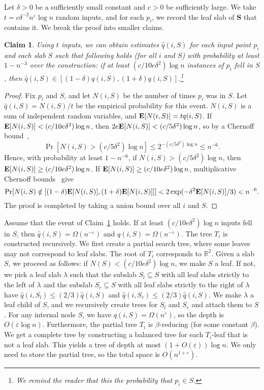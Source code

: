 \documentclass[letterpaper,11pt]{article}
\newtheorem{claim}[theorem]{Claim}
\newcommand{\eps}{\varepsilon}
\newcommand{\EX}{\hbox{\bf E}}
\newcommand{\R}{\mathbb{R}}
\newcommand{\bS}{\textbf{S}}
\begin{document}
Let $\delta > 0$ be a sufficiently 
small constant and $c > 0$
be sufficiently large. 
We take $t = c\delta^{-2}n^{\eps}\log n$ 
random inputs, and  for each $p_i$, we 
record the leaf slab of $\bS$ that 
contains it. We break the
proof into smaller claims.

\begin{claim} \label{clm:prob} 
  Using $t$ inputs, we can
  obtain estimates 
  $\hat{q}(i,S)$ for each input point $p_i$ 
  and each slab $S$ such that following 
  holds (for all $i$ and $S$)
  with probability at least $1 - n^{-3}$ over 
  the construction: 
  if at least $(c/10e\delta^{2})\log n$ 
  instances of $p_i$ fell in $S$,
  then $\hat{q}(i,S) \in  
  [(1-\delta)q(i,S),(1+\delta)q(i,S)]$.\footnote{We 
  remind the reader that this the
  probability that $p_i \in S$.}
\end{claim}

\begin{proof}
Fix $p_i$ and $S$, and
let $N(i,S)$ be the 
number of times $p_i$
was in $S$. 
Let $\hat{q}(i,S) = N(i,S)/t$ 
be the empirical 
probability for this event.
$N(i,S)$ is a sum of independent
random variables, and
$\EX[N(i,S)] = tq(i,S)$.
If $\EX[N(i,S)] < (c/10e\delta^{2})\log n$, 
then 
$2e\EX[N(i,S)] < (c/5\delta^2)\log n $, so
by a Chernoff 
bound~\cite[Theorem~1.1, Eq. (1.8)]{DubhashiPa09}, 
\[
  \Pr[N(i,S) > (c/5\delta^2)\log n] \leq 2^{-(c/5\delta^2)\log n} \leq n^{-6}.
\]
Hence, with probability at 
least $1-n^{-6}$, if 
$N(i,S) > (c/5\delta^2)\log n$, 
then $\EX[N(i,S)] \geq (c/10e\delta^{2})\log n$.
If $\EX[N(i,S)] \geq (c/10e\delta^{2})\log n$,  
multiplicative Chernoff 
bounds~\cite[Theorem 1.1, Eq. (1.7)]{DubhashiPa09}
give
\[
  \Pr[N(i,S) \notin [(1-\delta)\EX[N(i,S)], (1+\delta)\EX[N(i,S)]]] < 
    2\exp(-\delta^2\EX[N(i,S)]/3) < n^{-6}.
\]
The proof is completed by taking a union bound over all $i$ and $S$.
\end{proof}

Assume that the event
of Claim~\ref{clm:prob} holds.
If at least $(c/10e\delta^{2})\log n$ 
inputs fell in $S$, then 
$\hat{q}(i,S) = \Omega(n^{-\eps})$
and $q(i,S) = \Omega(n^{-\eps})$.
The tree $T_i$ is constructed recursively.
We first create a partial search tree, where
some leaves may not correspond to leaf slabs.
The root of $T_i$ corresponds to 
$\R^2$. Given a slab
$S$, we proceed as follows:
if $N(S) < (c/10e\delta^{2})\log n$, we make
$S$ a leaf. If not, we pick a leaf slab 
$\lambda$ such that the subslab 
$S_l \subseteq S$ with all leaf slabs 
strictly to the left of $\lambda$ and
the subslab $S_r \subseteq S$ with all 
leaf slabs strictly 
to the right of $\lambda$ have 
$\hat{q}(i,S_l) \leq (2/3)\hat{q}(i,S)$ and
$\hat{q}(i,S_r) \leq (2/3)\hat{q}(i,S)$. 
We make $\lambda$ a leaf child of $S$, and 
we recursively create trees for 
$S_l$ and $S_r$ and attach them to $S$. 
For any internal node $S$, we have 
$q(i,S) = \Omega(n^\eps)$,
so the depth is $O(\eps \log n)$. 
Furthermore,
the partial tree $T_i$ is $\beta$-reducing 
(for some constant $\beta$).
We get a complete tree
by constructing a balanced tree
for each $T_i$-leaf that is not a leaf slab. 
This yields a tree  of depth 
at most $(1+O(\eps))\log n$.
We only need to store the 
partial tree, 
so the total space 
is $O(n^{1+\eps})$.
\end{document}

